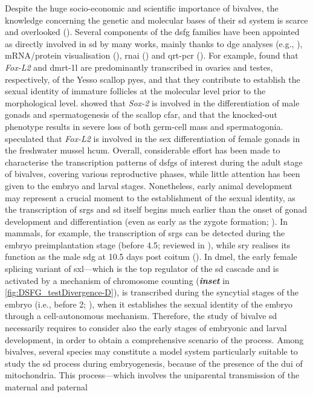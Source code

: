 Despite the huge socio-economic and scientific importance of bivalves, the knowledge concerning the genetic and molecular bases of their \gls{sd} system is scarce and overlooked (). Several components of the \gls{dsfg} families have been appointed as directly involved in \gls{sd} by many works, mainly thanks to \gls{dge} analyses (e.g., ), mRNA/protein visualisation (), \gls{rnai} () and \gls{qrt-pcr} (). For example,  found that \textit{Fox-L2} and \gls{dmrt-1l} are predominantly transcribed in ovaries and testes, respectively, of the Yesso scallop \gls{pyes}, and that they contribute to establish the sexual identity of immature follicles at the molecular level prior to the morphological level.  showed that \textit{Sox-2} is involved in the differentiation of male gonads and spermatogenesis of the scallop \gls{cfar}, and that the knocked-out phenotype results in severe loss of both germ-cell mass and spermatogonia.  speculated that \textit{Fox-L2} is involved in the sex differentiation of female gonads in the freshwater mussel \gls{hcum}. Overall, considerable effort has been made to characterise the transcription patterns of \glspl{dsfg} of interest during the adult stage of bivalves, covering various reproductive phases, while little attention has been given to the embryo and larval stages. Nonetheless, early animal development may represent a crucial moment to the establishment of the sexual identity, as the transcription of \glspl{srg} and \gls{sd} itself begins much earlier than the onset of gonad development and differentiation (even as early as the zygote formation; ). In mammals, for example, the transcription of \glspl{srg} can be detected during the embryo preimplantation stage (before \qty{4.5}{\dpf}; reviewed in ), while \gls{sry} realises its function as the male \gls{sdg} at 10.5 days post coitum (). In \gls{dmel}, the early female splicing variant of \gls{sxl}---which is the top regulator of the \gls{sd} cascade and is activated by a mechanism of chromosome counting (\textbf{\textit{inset}} in \cref{fig:DSFG_testDivergence-D}), is transcribed during the syncytial stages of the embryo (i.e., before \qty{2}{\hpf}; ), when it establishes the sexual identity of the embryo through a cell-autonomous mechanism. Therefore, the study of bivalve \gls{sd} necessarily requires to consider also the early stages of embryonic and larval development, in order to obtain a comprehensive scenario of the process. Among bivalves, several species may constitute a model system particularly suitable to study the \gls{sd} process during embryogenesis, because of the presence of the \gls{dui} of mitochondria. This process---which involves the uniparental transmission of the maternal and paternal 
